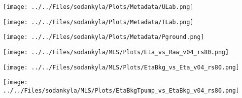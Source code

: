 \begin{frame}
\texttt{[image: ../../Files/sodankyla/Plots/Metadata/ULab.png]}
\end{frame}

\begin{frame}
\texttt{[image: ../../Files/sodankyla/Plots/Metadata/TLab.png]}
\end{frame}

\begin{frame}
\texttt{[image: ../../Files/sodankyla/Plots/Metadata/Pground.png]}
\end{frame}



\begin{frame}
\centering
\texttt{[image: ../../Files/sodankyla/MLS/Plots/Eta\_vs\_Raw\_v04\_rs80.png]}\\
\end{frame}

\begin{frame}
\texttt{[image: ../../Files/sodankyla/MLS/Plots/EtaBkg\_vs\_Eta\_v04\_rs80.png]}\\
\end{frame}

\begin{frame}
\texttt{[image: ../../Files/sodankyla/MLS/Plots/EtaBkgTpump\_vs\_EtaBkg\_v04\_rs80.png]}\\
\end{frame}

